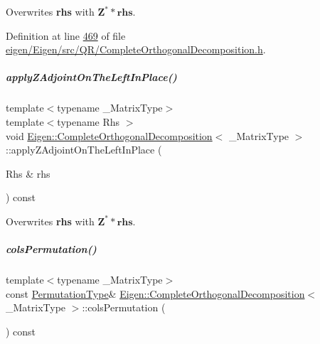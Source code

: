 Overwrites {\bfseries rhs} with $ \mathbf{Z}^* * \mathbf{rhs} $. 

Definition at line \hyperlink{eigen_2_eigen_2src_2_q_r_2_complete_orthogonal_decomposition_8h_source_l00469}{469} of file \hyperlink{eigen_2_eigen_2src_2_q_r_2_complete_orthogonal_decomposition_8h_source}{eigen/\+Eigen/src/\+Q\+R/\+Complete\+Orthogonal\+Decomposition.\+h}.

\mbox{\label{group___q_r___module_a0df74ceda234583a69d307c56bba4263}} 
\subparagraph{\texorpdfstring{apply\+Z\+Adjoint\+On\+The\+Left\+In\+Place()}{applyZAdjointOnTheLeftInPlace()}\hspace{0.1cm}{\footnotesize\ttfamily [2/2]}}
{\footnotesize\ttfamily template$<$typename \+\_\+\+Matrix\+Type$>$ \\
template$<$typename Rhs $>$ \\
void \hyperlink{group___q_r___module_class_eigen_1_1_complete_orthogonal_decomposition}{Eigen\+::\+Complete\+Orthogonal\+Decomposition}$<$ \+\_\+\+Matrix\+Type $>$\+::apply\+Z\+Adjoint\+On\+The\+Left\+In\+Place (\begin{DoxyParamCaption}\item[{Rhs \&}]{rhs }\end{DoxyParamCaption}) const\hspace{0.3cm}{\ttfamily [protected]}}

Overwrites {\bfseries rhs} with $ \mathbf{Z}^* * \mathbf{rhs} $. \mbox{\label{group___q_r___module_a601c67a4a0bbe9c7b25b885279db9ff2}} 
\subparagraph{\texorpdfstring{cols\+Permutation()}{colsPermutation()}\hspace{0.1cm}{\footnotesize\ttfamily [1/2]}}
{\footnotesize\ttfamily template$<$typename \+\_\+\+Matrix\+Type$>$ \\
const \hyperlink{group___core___module}{Permutation\+Type}\& \hyperlink{group___q_r___module_class_eigen_1_1_complete_orthogonal_decomposition}{Eigen\+::\+Complete\+Orthogonal\+Decomposition}$<$ \+\_\+\+Matrix\+Type $>$\+::cols\+Permutation (\begin{DoxyParamCaption}{ }\end{DoxyParamCaption}) const\hspace{0.3cm}{\ttfamily [inline]}}


